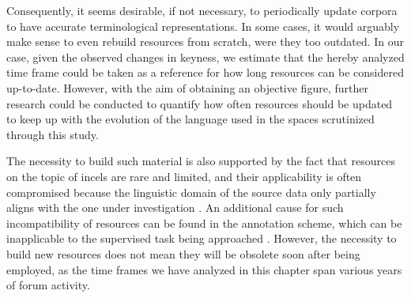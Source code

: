\documentclass[11pt]{article}
\begin{document}
Consequently, it seems desirable, if not necessary, to periodically update corpora to have accurate terminological representations. In some cases, it would arguably make sense to even rebuild resources from scratch, were they too outdated. In our case, given the observed changes in keyness, we estimate that the hereby analyzed time frame could be taken as a reference for how long resources can be considered up-to-date. However, with the aim of obtaining an objective figure, further research could be conducted to quantify how often resources should be updated to keep up with the evolution of the language used in the spaces scrutinized through this study.

The necessity to build such material is also supported by the fact that resources on the topic of incels are rare and limited, and their applicability is often compromised because the linguistic domain of the source data only partially aligns with the one under investigation \cite{pelzer-2021-toxic-language-incel-communities}. An additional cause for such incompatibility of resources can be found in the annotation scheme, which can be inapplicable to the supervised task being approached \cite{zhou-2022-automated-hs-detection}. However, the necessity to build new resources does not mean they will be obsolete soon after being employed, as the time frames we have analyzed in this chapter span various years of forum activity.



\end{document}
